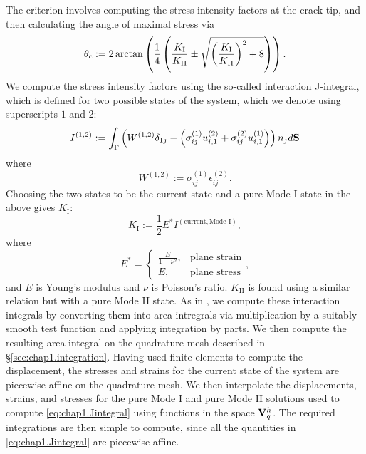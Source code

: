 The criterion involves computing the stress intensity factors at the crack tip, and then calculating the angle of maximal stress via
\begin{equation*}
\theta_c := 2 \arctan \left( \frac{1}{4} \left( \frac{K_{\text{I}}}{K_{\text{II}}} \pm \sqrt{\left( \frac{K_{\text{I}}}{K_{\text{II}}} \right)^2 + 8} \right) \right).
\end{equation*}
We compute the stress intensity factors using the so-called interaction J-integral, which is defined for two possible states of the system, which we denote using superscripts $1$ and $2$:
\begin{equation} \label{eq:chap1.Jintegral}
I^{(1,2)} := \int_{\Gamma} \left( W^{(1,2)} \delta_{1j} - \left( \sigma_{ij}^{(1)} u_{i,1}^{(2)} + \sigma_{ij}^{(2)} u_{i,1}^{(1)} \right) \right) n_j d\mathbf{S}
\end{equation}
where
\begin{equation*}
W^{(1,2)} := \sigma_{ij}^{(1)} \epsilon_{ij}^{(2)}.
\end{equation*}
Choosing the two states to be the current state and a pure Mode I state in the above gives $K_{\text{I}}$:
\begin{equation*}
K_{\text{I}} := \frac{1}{2} E^* I^{(\text{current}, \text{Mode I})},
\end{equation*}
where
\begin{equation*}
E^* = \begin{cases} {\displaystyle \frac{E}{1 - \nu^2}}, & \text{plane strain} \\ E, & \text{plane stress} \end{cases},
\end{equation*}
and $E$ is Young's modulus and $\nu$ is Poisson's ratio. $K_{\text{II}}$ is found using a similar relation but with a pure Mode II state. As in \cite{Moes99}, we compute these interaction integrals by converting them into area intregrals via multiplication by a suitably smooth test function and applying integration by parts. We then compute the resulting area integral on the quadrature mesh described in \S\ref{sec:chap1.integration}. Having used finite elements to compute the displacement, the stresses and strains for the current state of the system are piecewise affine on the quadrature mesh. We then interpolate the displacements, strains, and stresses for the pure Mode I and pure Mode II solutions used to compute \eqref{eq:chap1.Jintegral} using functions in the space $\mathbf{V}_q^h$. The required integrations are then simple to compute, since all the quantities in \eqref{eq:chap1.Jintegral} are piecewise affine. 

